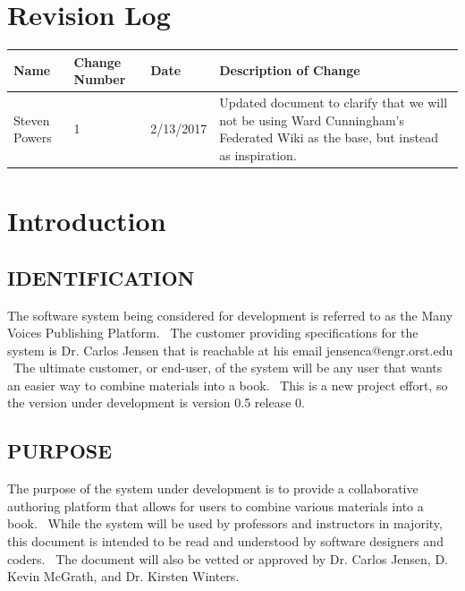 \documentclass[onecolumn, draftclsnofoot,10pt, compsoc]{IEEEtran}
\begin{document}
\section{Revision Log}
\begin{flushleft}
\tablehead{}
\begin{supertabular}{|p{3cm}|p{3cm}|p{3cm}|p{7cm}|}
\hline
Name & Change Number & Date & Description of Change  
\\\hline
Steven Powers & 1 & 2/13/2017 & Updated document to clarify  that we will not be using Ward Cunningham's Federated Wiki as the base, but instead as inspiration.
\\ \hline

\end{supertabular}
\end{flushleft}



\section[Introduction]{Introduction}

\subsection[IDENTIFICATION]{IDENTIFICATION}


{\noindent
The software system being considered for development is referred to as the Many Voices
Publishing Platform. \ The customer providing specifications
for the system is Dr. Carlos Jensen that is reachable at his email jensenca@engr.orst.edu \
The ultimate customer, or end-user, of the system will be any user that wants an easier
way to combine materials into a book. \ This is a new project effort, so the
version under development is version 0.5 release 0.}

\subsection[PURPOSE]{PURPOSE}

{\noindent
The purpose of the system under
development is to provide a collaborative authoring platform that allows for users to
combine various materials into a book. \ While the system will be used by professors and
instructors in majority, this document is intended to be read and understood by software
designers and coders. \ The document will also be vetted or
approved by Dr. Carlos Jensen, D. Kevin McGrath, and Dr. Kirsten Winters.}
\end{document}
